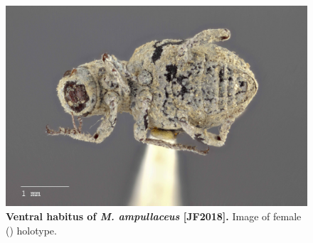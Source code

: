 \documentclass[fleqn,10pt,lineno]{wlpeerj} %
\begin{document}
\begin{figure}[h]
	\begin{sideways}
		\centering
		\includegraphics[height=\textwidth]{figure3.jpg}
	\end{sideways}
	\caption{\textbf{Ventral habitus of \textit{M. ampullaceus} [JF2018].} Image of female (\female) holotype.}
	\label{fig:ampullaceus_F_ventral}
\end{figure}
\end{document}
